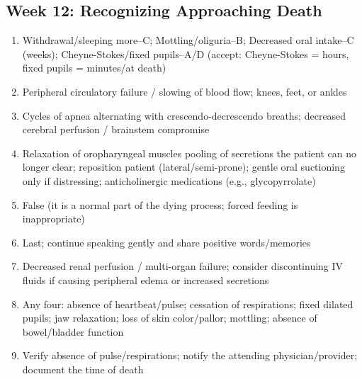 \documentclass[11pt,letterpaper]{article}
\begin{document}
\begin{keybox}
\subsection*{Week 12: Recognizing Approaching Death}
\begin{enumerate}[leftmargin=1.5em,label=\textbf{\arabic*.},start=151]
  \item Withdrawal/sleeping more--C; Mottling/oliguria--B;
        Decreased oral intake--C (weeks); Cheyne-Stokes/fixed pupils--A/D
        (accept: Cheyne-Stokes = hours, fixed pupils = minutes/at death)
  \item Peripheral circulatory failure / slowing of blood flow; knees, feet, or ankles
  \item Cycles of apnea alternating with crescendo-decrescendo breaths; decreased cerebral
        perfusion / brainstem compromise
  \item Relaxation of oropharyngeal muscles pooling of secretions the patient can no longer
        clear; reposition patient (lateral/semi-prone); gentle oral suctioning only if
        distressing; anticholinergic medications (e.g., glycopyrrolate)
  \item False (it is a normal part of the dying process; forced feeding is inappropriate)
  \item Last; continue speaking gently and share positive words/memories
  \item Decreased renal perfusion / multi-organ failure; consider discontinuing IV fluids if
        causing peripheral edema or increased secretions
  \item Any four: absence of heartbeat/pulse; cessation of respirations; fixed dilated pupils;
        jaw relaxation; loss of skin color/pallor; mottling; absence of bowel/bladder function
  \item Verify absence of pulse/respirations; notify the attending physician/provider;
        document the time of death
\end{enumerate}

\hrulefill

\end{keybox}
\end{document}

